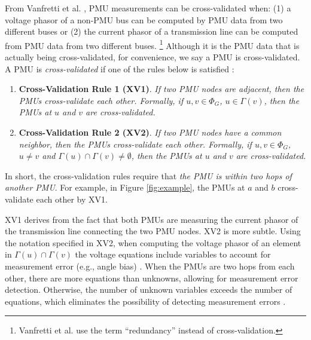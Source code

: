 From Vanfretti et al. \cite{Vanfretti10}, PMU measurements can be cross-validated when: (1) a 
voltage phasor of a non-PMU bus can be computed by PMU data from two different buses or (2) the current phasor of a transmission line can be computed from PMU data from two different buses. 
{\footnote {\small  Vanfretti et al. \cite{Vanfretti10} use the term ``redundancy'' instead of cross-validation. }}  
Although it is the PMU data that is actually being cross-validated,
for convenience, we say a PMU is cross-validated. 
A PMU is \emph{cross-validated} if one of the rules below is satisfied \cite{Vanfretti10}: 
\begin{enumerate}
	
	\item {\bf Cross-Validation Rule 1 (XV1)}.  {\it If two PMU nodes are adjacent, then the PMUs cross-validate each other. %
	Formally, if $u, v \in \Phi_G$, $u \in \Gamma(v)$, then the PMUs at $u$ and $v$ are cross-validated.}

	\item {\bf Cross-Validation Rule 2 (XV2)}. {\it If two PMU nodes have a common neighbor, then the PMUs cross-validate each other. %
	Formally, if $u, v \in \Phi_G$, $u\neq v$ and $\Gamma(u)\cap\Gamma(v)\neq\emptyset$, then the PMUs at $u$ and $v$ are cross-validated.}
\end{enumerate}
In short, the cross-validation rules require that {\em the PMU is within two hops of another PMU}.
For example, in Figure \ref{fig:example}, the PMUs at $a$ and $b$ cross-validate each other by XV1. 

XV1 derives from the fact that both PMUs are measuring the current phasor of the transmission line connecting the two PMU nodes.  XV2 is more subtle.  
Using the notation specified in XV2, when computing the voltage phasor of an element in $\Gamma(u)\cap\Gamma(v)$ the voltage equations include variables to 
account for measurement error (e.g., angle bias) \cite{Vanfretti-thesis}. %
When the PMUs are two hops from each other, there are more equations than unknowns, allowing for measurement error detection. 
Otherwise, the number of unknown variables exceeds the number of equations, which eliminates the possibility of detecting measurement errors \cite{Vanfretti-thesis}.

